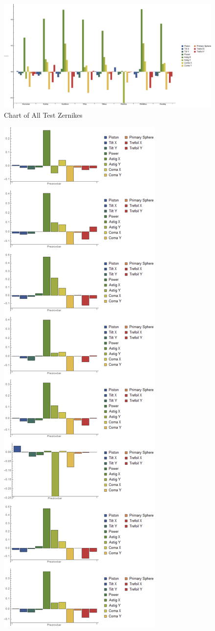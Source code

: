 \documentclass{article}
\begin{document}
\begin{figure}[h!]
	\centering
	\includegraphics[width=.8\linewidth]{GraphData_IndividualTests_minusref2.eps}
	\caption{Chart of All Test Zernikes}
	\label{minrefgraph}
\end{figure}
\begin{figure}
	\centering
	\includegraphics[scale=0.25]{GraphData_IndividualTests_minusref2}

\end{figure}
\end{document}

